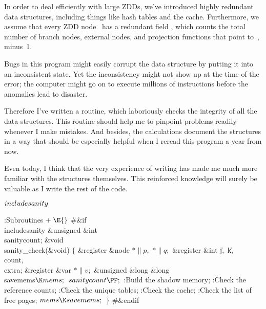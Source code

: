 In order to deal efficiently with large ZDDs, we've
introduced highly
redundant data structures, including things like hash tables and the cache.
Furthermore, we assume that every ZDD node~ has a redundant field
, which counts the total number of branch nodes, external
nodes,
and projection functions that point to~, minus~1.

Bugs in this program might easily corrupt the data structure by putting it
into an inconsistent state. Yet the inconsistency might not show up at the
time of the error; the computer might go on to execute millions of
instructions before the anomalies lead to disaster.

Therefore I've written a  routine, which laboriously
checks the
integrity of all the data structures. This routine should help me to pinpoint
problems readily whenever I make mistakes. And besides, the 
calculations document the structures in a way that should be especially
helpful when I reread this program a year from now.

Even today, I think that the very experience of writing 
has
made me much more familiar with the structures themselves. This reinforced
knowledge will surely be valuable as I write the rest of the code.

\Y\B\4\D$\\{includesanity}$ \5
\par
\Y\B\4:Subroutines\X${}\mathrel+\E{}$\6
\8\#\&{if} \\{includesanity}\6
\&{unsigned} \&{int} \\{sanitycount};\7
\&{void} \\{sanity\_check}(\&{void})\1\1\2\2\6
${}\{{}$\1\6
\&{register} \&{node} ${}{*}\|p,{}$ ${}{*}\|q;{}$\6
\&{register} \&{int} \|j${},{}$ \|k${},{}$ \\{count}${},{}$ \\{extra};\6
\&{register} \&{var} ${}{*}\|v;{}$\6
\&{unsigned} \&{long} \&{long} \\{savemems}${}\K\\{mems};{}$\7
${}\\{sanitycount}\PP;{}$\6
:Build the shadow memory\X;\6
:Check the reference counts\X;\6
:Check the unique tables\X;\6
:Check the cache\X;\6
:Check the list of free pages\X;\6
${}\\{mems}\K\\{savemems};{}$\6
\4${}\}{}$\2\6
\8\#\&{endif}\par
\fi

